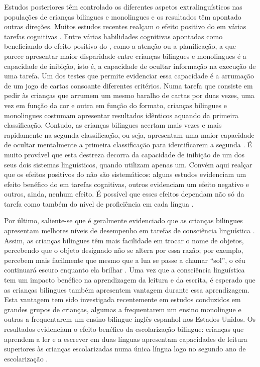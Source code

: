 \documentclass[output=paper]{LSP/langsci}
\begin{document}
Estudos posteriores têm controlado os diferentes aspetos extralinguísticos nas populações de crianças bilingues e monolingues e os resultados têm apontado outras direções. Muitos estudos recentes realçam o efeito positivo do  em várias tarefas cognitivas \citep{bialystock2001}. Entre várias habilidades cognitivas apontadas como beneficiando do efeito positivo do , como a atenção ou a planificação, a que parece apresentar maior disparidade entre crianças bilingues e monolingues é a capacidade de inibição, isto é, a capacidade de ocultar informação na execução de uma tarefa. Um dos testes que permite evidenciar essa capacidade é a arrumação de um jogo de cartas consoante diferentes critérios. Numa tarefa que consiste em pedir às crianças que arrumem um mesmo baralho de cartas por duas vezes, uma vez em função da cor e outra em função do formato, crianças bilingues e monolingues costumam apresentar resultados idênticos aquando da primeira classificação. Contudo, as crianças bilingues acertam mais vezes e mais rapidamente na segunda classificação, ou seja, apresentam uma maior capacidade de ocultar mentalmente a primeira classificação para identificarem a segunda \citep{pearson2009}. É muito provável que esta destreza decorra da capacidade de inibição de um dos seus dois sistemas linguísticos, quando utilizam apenas um. Convém aqui realçar que os efeitos positivos do  não são sistemáticos: alguns estudos evidenciam um efeito benéfico do  em tarefas cognitivas, outros evidenciam um efeito negativo e outros, ainda, nenhum efeito. É possível que esses efeitos dependam não só da tarefa como também do nível de proficiência em cada língua \citep{genesee_etal2004}.

Por último, saliente-se que é geralmente evidenciado que as crianças bilingues apresentam melhores níveis de desempenho em tarefas de consciência linguística \citep{genesee_etal2004}. Assim, as crianças bilingues têm mais facilidade em trocar o nome de objetos, percebendo que o objeto designado não se altera por essa razão; por exemplo, percebem mais facilmente que mesmo que a lua se passe a chamar ``sol'', o céu continuará escuro enquanto ela brilhar \citep{pearson2009}. Uma vez que a consciência linguística tem um impacto benéfico na aprendizagem da leitura e da escrita, é esperado que as crianças bilingues também apresentem vantagem durante essa aprendizagem. Esta vantagem tem sido investigada recentemente em estudos conduzidos em grandes grupos de crianças, algumas a frequentarem um ensino monolingue e outras a frequentarem um ensino bilingue inglês-espanhol nos Estados-Unidos. Os resultados evidenciam o efeito benéfico da escolarização bilingue: crianças que aprendem a ler e a escrever em duas línguas apresentam capacidades de leitura superiores às crianças escolarizadas numa única língua logo no segundo ano de escolarização \citep{pearson2009}.
\end{document}
